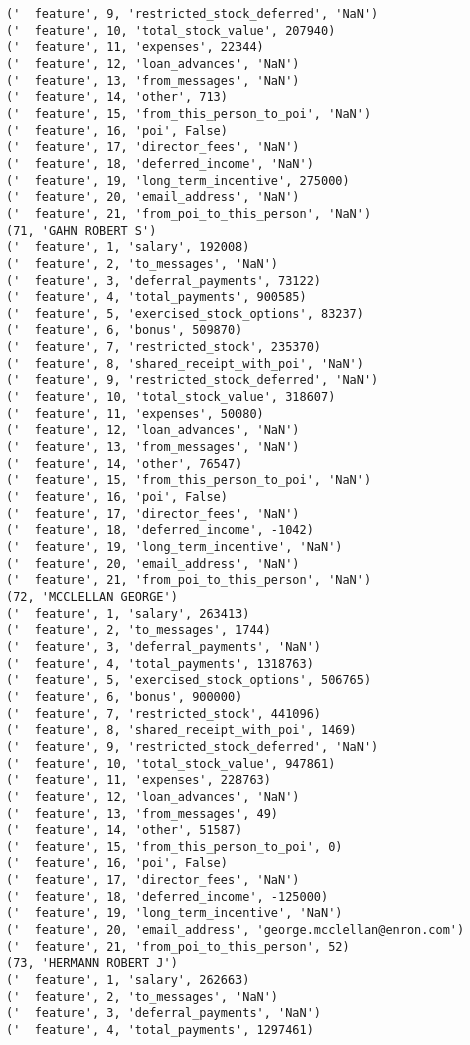 \begin{verbatim}
('  feature', 9, 'restricted_stock_deferred', 'NaN')
('  feature', 10, 'total_stock_value', 207940)
('  feature', 11, 'expenses', 22344)
('  feature', 12, 'loan_advances', 'NaN')
('  feature', 13, 'from_messages', 'NaN')
('  feature', 14, 'other', 713)
('  feature', 15, 'from_this_person_to_poi', 'NaN')
('  feature', 16, 'poi', False)
('  feature', 17, 'director_fees', 'NaN')
('  feature', 18, 'deferred_income', 'NaN')
('  feature', 19, 'long_term_incentive', 275000)
('  feature', 20, 'email_address', 'NaN')
('  feature', 21, 'from_poi_to_this_person', 'NaN')
(71, 'GAHN ROBERT S')
('  feature', 1, 'salary', 192008)
('  feature', 2, 'to_messages', 'NaN')
('  feature', 3, 'deferral_payments', 73122)
('  feature', 4, 'total_payments', 900585)
('  feature', 5, 'exercised_stock_options', 83237)
('  feature', 6, 'bonus', 509870)
('  feature', 7, 'restricted_stock', 235370)
('  feature', 8, 'shared_receipt_with_poi', 'NaN')
('  feature', 9, 'restricted_stock_deferred', 'NaN')
('  feature', 10, 'total_stock_value', 318607)
('  feature', 11, 'expenses', 50080)
('  feature', 12, 'loan_advances', 'NaN')
('  feature', 13, 'from_messages', 'NaN')
('  feature', 14, 'other', 76547)
('  feature', 15, 'from_this_person_to_poi', 'NaN')
('  feature', 16, 'poi', False)
('  feature', 17, 'director_fees', 'NaN')
('  feature', 18, 'deferred_income', -1042)
('  feature', 19, 'long_term_incentive', 'NaN')
('  feature', 20, 'email_address', 'NaN')
('  feature', 21, 'from_poi_to_this_person', 'NaN')
(72, 'MCCLELLAN GEORGE')
('  feature', 1, 'salary', 263413)
('  feature', 2, 'to_messages', 1744)
('  feature', 3, 'deferral_payments', 'NaN')
('  feature', 4, 'total_payments', 1318763)
('  feature', 5, 'exercised_stock_options', 506765)
('  feature', 6, 'bonus', 900000)
('  feature', 7, 'restricted_stock', 441096)
('  feature', 8, 'shared_receipt_with_poi', 1469)
('  feature', 9, 'restricted_stock_deferred', 'NaN')
('  feature', 10, 'total_stock_value', 947861)
('  feature', 11, 'expenses', 228763)
('  feature', 12, 'loan_advances', 'NaN')
('  feature', 13, 'from_messages', 49)
('  feature', 14, 'other', 51587)
('  feature', 15, 'from_this_person_to_poi', 0)
('  feature', 16, 'poi', False)
('  feature', 17, 'director_fees', 'NaN')
('  feature', 18, 'deferred_income', -125000)
('  feature', 19, 'long_term_incentive', 'NaN')
('  feature', 20, 'email_address', 'george.mcclellan@enron.com')
('  feature', 21, 'from_poi_to_this_person', 52)
(73, 'HERMANN ROBERT J')
('  feature', 1, 'salary', 262663)
('  feature', 2, 'to_messages', 'NaN')
('  feature', 3, 'deferral_payments', 'NaN')
('  feature', 4, 'total_payments', 1297461)

\end{verbatim}
